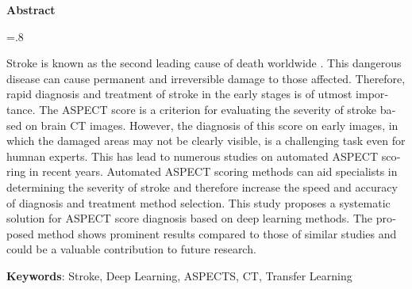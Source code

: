 


\pagestyle{empty}

\begin{latin}

\begin{center}
\textbf{Abstract}
\end{center}
\baselineskip=.8\baselineskip

Stroke is known as the second leading cause of death worldwide \cite{donkor2018stroke}.
This dangerous disease can cause permanent and irreversible damage to those affected.
Therefore, rapid diagnosis and treatment of stroke in the early stages is of utmost importance.
The ASPECT score is a criterion for evaluating the severity of stroke based on brain CT images.
However, the diagnosis of this score on early images, in which the damaged areas may not be clearly visible, is a challenging task even for humnan experts.
This has lead to numerous studies on automated ASPECT scoring in recent years.
Automated ASPECT scoring methods can aid specialists in determining the severity of stroke and therefore increase the speed and accuracy of diagnosis and treatment method selection.
This study proposes a systematic solution for ASPECT score diagnosis based on deep learning methods.
The proposed method shows prominent results compared to those of similar studies and could be a valuable contribution to future research.

\bigskip\noindent\textbf{Keywords}:
Stroke, Deep Learning, ASPECTS, CT, Transfer Learning

\end{latin}
